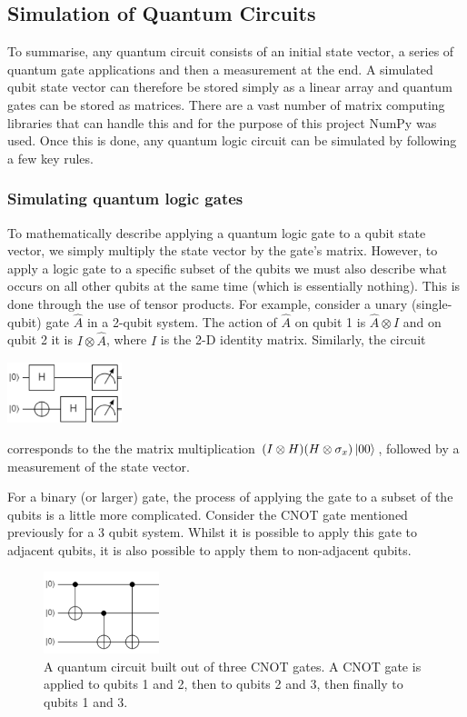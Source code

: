 \documentclass{article}[11pt]
\begin{document}
\subsection{Simulation of Quantum Circuits}\label{section:simulation}
To summarise, any quantum circuit consists of an initial state vector, a series of quantum gate applications and then a measurement at the end. A simulated qubit state vector can therefore be stored simply as a linear array and quantum gates can be stored as matrices. There are a vast number of matrix computing libraries that can handle this and for the purpose of this project NumPy\cite{python,numpy} was used. Once this is done, any quantum logic circuit can be simulated by following a few key rules.

\subsubsection{Simulating quantum logic gates}
To mathematically describe applying a quantum logic gate to a qubit state vector, we simply multiply the state vector by the gate's matrix. However, to apply a logic gate to a specific subset of the qubits we must also describe what occurs on all other qubits at the same time (which is essentially nothing). This is done through the use of tensor products.\cite{nielsenChuang} For example, consider a unary (single-qubit) gate $\hat A$ in a 2-qubit system. The action of $\hat A$ on qubit 1 is $\hat A\otimes I$ and on qubit 2 it is $I\otimes\hat A$, where $I$ is the 2-D identity matrix. Similarly, the circuit
\begin{center}
\includegraphics[width=0.25\textwidth]{Pictures/tiny-circuit.png}
\end{center}
corresponds to the the matrix multiplication $(I\otimes H)(H\otimes\sigma_x)\ket{00}$, followed by a measurement of the state vector.

For a binary (or larger) gate, the process of applying the gate to a subset of the qubits is a little more complicated. Consider the CNOT gate mentioned previously for a 3 qubit system. Whilst it is possible to apply this gate to adjacent qubits, it is also possible to apply them to non-adjacent qubits.
\begin{figure}[H]
    \centering
    \includegraphics[width=0.3\textwidth]{Pictures/cnot-circuit.png}
    \caption{A quantum circuit built out of three CNOT gates. A CNOT gate is applied to qubits 1 and 2, then to qubits 2 and 3, then finally to qubits 1 and 3.}
    \label{fig:cnot_circuit1}
\end{figure}
\end{document}
